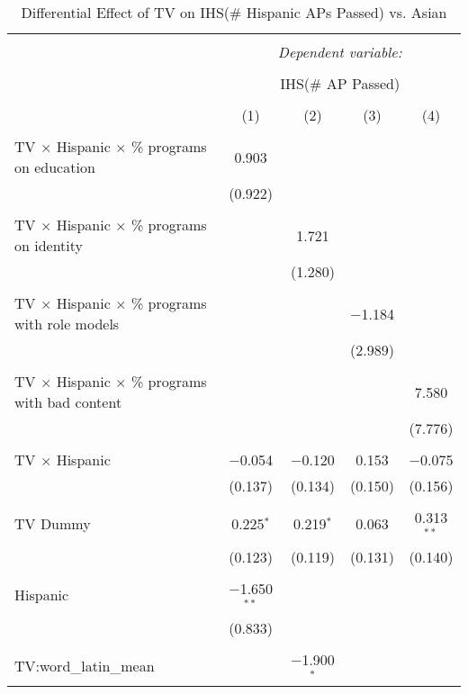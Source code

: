 
\begin{table}[!htbp] \centering 
  \caption{Differential Effect of TV on IHS(\# Hispanic APs Passed) vs. Asian} 
  \label{} 
\begin{tabular}{@{\extracolsep{-2pt}}lcccc} 
\\[-1.8ex]\hline 
\hline \\[-1.8ex] 
 & \multicolumn{4}{c}{\textit{Dependent variable:}} \\ 
\cline{2-5} 
\\[-1.8ex] & \multicolumn{4}{c}{IHS(\# AP Passed)} \\ 
\\[-1.8ex] & (1) & (2) & (3) & (4)\\ 
\hline \\[-1.8ex] 
 TV $\times$ Hispanic $\times$ \% programs on education & 0.903 &  &  &  \\ 
  & (0.922) &  &  &  \\ 
  & & & & \\ 
 TV $\times$ Hispanic $\times$ \% programs on identity &  & 1.721 &  &  \\ 
  &  & (1.280) &  &  \\ 
  & & & & \\ 
 TV $\times$ Hispanic $\times$ \% programs with role models &  &  & $-$1.184 &  \\ 
  &  &  & (2.989) &  \\ 
  & & & & \\ 
 TV $\times$ Hispanic $\times$ \% programs with bad content &  &  &  & 7.580 \\ 
  &  &  &  & (7.776) \\ 
  & & & & \\ 
 TV $\times$ Hispanic & $-$0.054 & $-$0.120 & 0.153 & $-$0.075 \\ 
  & (0.137) & (0.134) & (0.150) & (0.156) \\ 
  & & & & \\ 
 TV Dummy & 0.225$^{*}$ & 0.219$^{*}$ & 0.063 & 0.313$^{**}$ \\ 
  & (0.123) & (0.119) & (0.131) & (0.140) \\ 
  & & & & \\ 
 Hispanic & $-$1.650$^{**}$ &  &  &  \\ 
  & (0.833) &  &  &  \\ 
  & & & & \\ 
 TV:word\_latin\_mean &  & $-$1.900$^{*}$ &  &  \\ 

\end{tabular}
\end{table}
